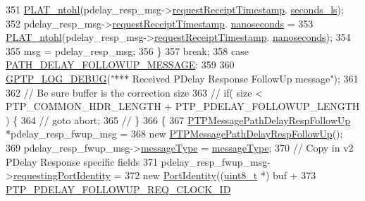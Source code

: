 \begin{DoxyCode}
{{{{{{{{351                 \hyperlink{linux_2src_2platform_8cpp_ad335681c3444e0406899693a6f782173}{PLAT\_ntohl}(pdelay\_resp\_msg->\hyperlink{class_p_t_p_message_path_delay_resp_a981c3fe148ecddf9f1091675650ccd48}{requestReceiptTimestamp}.
      \hyperlink{class_timestamp_a2bf200e58cd268d8b86cf93c51500a44}{seconds\_ls});
352             pdelay\_resp\_msg->\hyperlink{class_p_t_p_message_path_delay_resp_a981c3fe148ecddf9f1091675650ccd48}{requestReceiptTimestamp}.
      \hyperlink{class_timestamp_a78ae11d98fcfe738239d0a853d82c84a}{nanoseconds} =
353                 \hyperlink{linux_2src_2platform_8cpp_ad335681c3444e0406899693a6f782173}{PLAT\_ntohl}(pdelay\_resp\_msg->\hyperlink{class_p_t_p_message_path_delay_resp_a981c3fe148ecddf9f1091675650ccd48}{requestReceiptTimestamp}.
      \hyperlink{class_timestamp_a78ae11d98fcfe738239d0a853d82c84a}{nanoseconds});
354 
355             msg = pdelay\_resp\_msg;
356         \}
357         \textcolor{keywordflow}{break};
358     \textcolor{keywordflow}{case} \hyperlink{avbts__message_8hpp_ac6606ebe91c8ac66a2c314c79f5ab013adda4323fc121fba997bb5aa704a9dde8}{PATH\_DELAY\_FOLLOWUP\_MESSAGE}:
359 
360         \hyperlink{gptp__log_8hpp_ae4c6efe7c9cf6d7d3bbd28a0fd087d61}{GPTP\_LOG\_DEBUG}(\textcolor{stringliteral}{"*** Received PDelay Response FollowUp message"});
361 
362         \textcolor{comment}{// Be sure buffer is the correction size}
363 \textcolor{comment}{//     if( size < PTP\_COMMON\_HDR\_LENGTH + PTP\_PDELAY\_FOLLOWUP\_LENGTH ) \{}
364 \textcolor{comment}{//       goto abort;}
365 \textcolor{comment}{//     \}}
366         \{
367             \hyperlink{class_p_t_p_message_path_delay_resp_follow_up}{PTPMessagePathDelayRespFollowUp} *pdelay\_resp\_fwup\_msg =
368                 \textcolor{keyword}{new} \hyperlink{class_p_t_p_message_path_delay_resp_follow_up}{PTPMessagePathDelayRespFollowUp}();
369             pdelay\_resp\_fwup\_msg->\hyperlink{class_p_t_p_message_common_adb32627aa5b0e2dbad3ccd88aab07c05}{messageType} = \hyperlink{class_p_t_p_message_common_adb32627aa5b0e2dbad3ccd88aab07c05}{messageType};
370             \textcolor{comment}{// Copy in v2 PDelay Response specific fields}
371             pdelay\_resp\_fwup\_msg->\hyperlink{class_p_t_p_message_path_delay_resp_follow_up_a27e69c7fb521ebffca13229a7c4658ce}{requestingPortIdentity} =
372                 \textcolor{keyword}{new} \hyperlink{class_port_identity}{PortIdentity}((\hyperlink{stdint_8h_aba7bc1797add20fe3efdf37ced1182c5}{uint8\_t} *) buf +
373                          \hyperlink{avbts__message_8hpp_a888c4d23c6d7221b962cdb21af1c9919}{PTP\_PDELAY\_FOLLOWUP\_REQ\_CLOCK\_ID}
}}}}}}}}
\end{DoxyCode}
